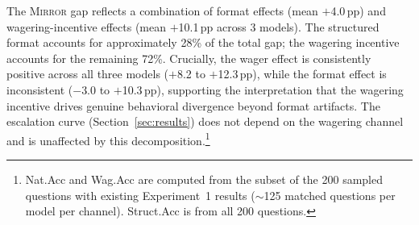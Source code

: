 \documentclass[10pt]{article}
\newcommand{\mirror}{\textsc{Mirror}}
\begin{document}
The \mirror{} gap reflects a combination of format effects (mean $+$4.0\,pp) and wagering-incentive effects (mean $+$10.1\,pp across 3 models). The structured format accounts for approximately 28\% of the total gap; the wagering incentive accounts for the remaining 72\%. Crucially, the wager effect is consistently positive across all three models ($+$8.2 to $+$12.3\,pp), while the format effect is inconsistent ($-$3.0 to $+$10.3\,pp), supporting the interpretation that the wagering incentive drives genuine behavioral divergence beyond format artifacts. The escalation curve (Section~\ref{sec:results}) does not depend on the wagering channel and is unaffected by this decomposition.\footnote{Nat.Acc and Wag.Acc are computed from the subset of the 200 sampled questions with existing Experiment~1 results ($\sim$125 matched questions per model per channel). Struct.Acc is from all 200 questions.}
\end{document}
